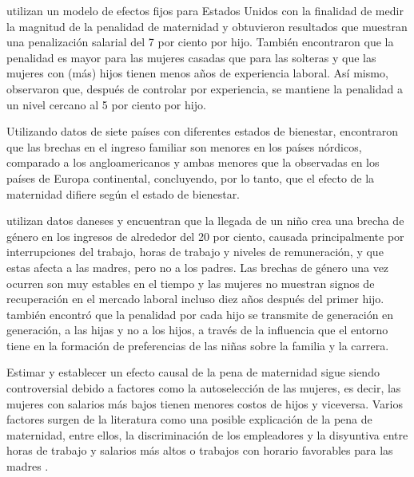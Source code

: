 \citet{Budig2001} utilizan un modelo de efectos fijos para Estados Unidos con la finalidad de medir la magnitud de la penalidad de maternidad y obtuvieron resultados que muestran una penalización salarial del 7 por ciento por hijo. También encontraron que la penalidad es mayor para las mujeres casadas que para las solteras y que las mujeres con (más) hijos tienen menos años de experiencia laboral. Así mismo, observaron que, después de controlar por experiencia, se mantiene la penalidad a un nivel cercano al 5 por ciento por hijo.

Utilizando datos de siete países con diferentes estados de bienestar, \citet{SigleRushton2007} encontraron que las brechas en el ingreso familiar son menores en los países nórdicos, comparado a los angloamericanos y ambas menores que la observadas en los países de Europa continental, concluyendo, por lo tanto, que el efecto de la maternidad difiere según el estado de bienestar.

\citet{Kleven2019} utilizan datos daneses y encuentran que la llegada de un niño crea una brecha de género en los ingresos de alrededor del 20 por ciento, causada principalmente por interrupciones del trabajo, horas de trabajo y niveles de remuneración, y que estas afecta a las madres, pero no a los padres. Las brechas de género una vez ocurren son muy estables en el tiempo y las mujeres no muestran signos de recuperación en el mercado laboral incluso diez años después del primer hijo. \citet{Kleven2019} también encontró que la penalidad por cada hijo se transmite de generación en generación, a las hijas y no a los hijos, a través de la influencia que el entorno tiene en la formación de preferencias de las niñas sobre la familia y la carrera.

Estimar y establecer un efecto causal de la pena de maternidad sigue siendo controversial debido a factores como la autoselección de las mujeres, es decir, las mujeres con salarios más bajos tienen menores costos de hijos y viceversa. Varios factores surgen de la literatura como una posible explicación de la pena de maternidad, entre ellos, la discriminación de los empleadores y la disyuntiva entre horas de trabajo y salarios más altos o trabajos con horario favorables para las madres \citep{Budig2001}.

